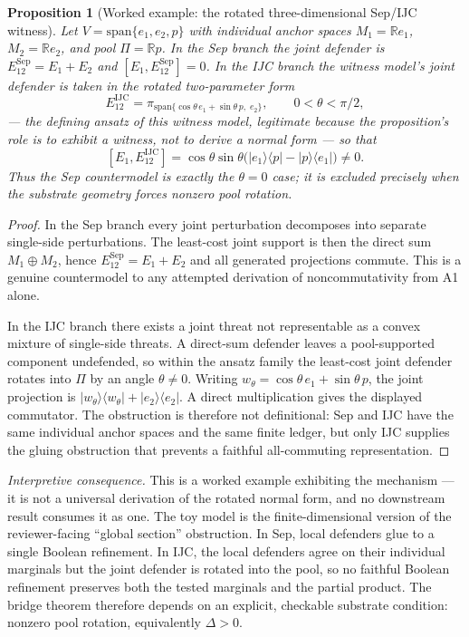 \documentclass[11pt]{article}
\newtheorem{proposition}[theorem]{Proposition}
\theoremstyle{definition}
\begin{document}
\begin{proposition}[Worked example: the rotated three-dimensional Sep/IJC witness]
\label{prop:minimal_ijc_witness}
Let $V=\mathrm{span}\{e_1,e_2,p\}$ with individual anchor spaces
$M_1=\mathbb{R}e_1$, $M_2=\mathbb{R}e_2$, and pool
$\Pi=\mathbb{R}p$.  In the Sep branch the joint defender is
$E_{12}^{\mathrm{Sep}}=E_1+E_2$ and $[E_1,E_{12}^{\mathrm{Sep}}]=0$.
In the IJC branch the witness model's joint defender is taken in the
rotated two-parameter form
\[
  E_{12}^{\mathrm{IJC}}
  = \pi_{\mathrm{span}\{\cos\theta\,e_1+\sin\theta\,p,\;e_2\}},
  \qquad 0<\theta<\pi/2,
\]
--- the defining ansatz of this witness model, legitimate because the
proposition's role is to exhibit a witness, not to derive a normal form ---
so that
\[
  [E_1,E_{12}^{\mathrm{IJC}}]
  = \cos\theta\sin\theta\bigl(|e_1\rangle\langle p|
    - |p\rangle\langle e_1|\bigr) \ne 0.
\]
Thus the Sep countermodel is exactly the $\theta=0$ case; it is excluded
precisely when the substrate geometry forces nonzero pool rotation.
\end{proposition}

\begin{proof}
In the Sep branch every joint perturbation decomposes into separate
single-side perturbations.  The least-cost joint support is then the
direct sum $M_1\oplus M_2$, hence $E_{12}^{\mathrm{Sep}}=E_1+E_2$ and
all generated projections commute.  This is a genuine countermodel to
any attempted derivation of noncommutativity from A1 alone.

In the IJC branch there exists a joint threat not representable as a
convex mixture of single-side threats.  A direct-sum defender leaves a
pool-supported component undefended, so within the ansatz family the
least-cost joint defender rotates into $\Pi$ by an angle $\theta\ne0$.  Writing
$w_\theta=\cos\theta\,e_1+\sin\theta\,p$, the joint projection is
$|w_\theta\rangle\langle w_\theta|+|e_2\rangle\langle e_2|$.  A direct
multiplication gives the displayed commutator.  The obstruction is
therefore not definitional: Sep and IJC have the same individual anchor
spaces and the same finite ledger, but only IJC supplies the gluing
obstruction that prevents a faithful all-commuting representation.
\end{proof}

\noindent\textit{Interpretive consequence.}\quad
This is a worked example exhibiting the mechanism --- it is not a
universal derivation of the rotated normal form, and no downstream
result consumes it as one.  The toy model is the finite-dimensional
version of the reviewer-facing ``global section'' obstruction.  In Sep, local defenders glue to a single
Boolean refinement.  In IJC, the local defenders agree on their individual
marginals but the joint defender is rotated into the pool, so no faithful
Boolean refinement preserves both the tested marginals and the partial
product.  The bridge theorem therefore depends on an explicit, checkable
substrate condition: nonzero pool rotation, equivalently $\Delta>0$.
\end{document}
